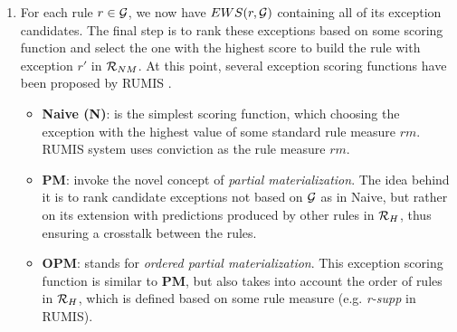 \begin{enumerate}
\item For each rule $r \in \mathcal{G}$, we now have $EWS(r,\mathcal{G})$ containing all of its exception candidates. The final step is to rank these exceptions based on some scoring function and select the one with the highest score to build the rule with exception $r'$ in $\mathcal{R}_{NM}$. At this point, several exception scoring functions have been proposed by RUMIS \cite{rumis}.
\begin{itemize}
\item \textbf{Naive (N)}: is the simplest scoring function, which choosing the exception with the highest value of some standard rule measure $rm$. RUMIS system uses conviction as the rule measure $rm$.
\item \textbf{PM}: invoke the novel concept of \textit{partial materialization}. The idea behind it is to rank candidate exceptions not based on $\mathcal{G}$ as in Naive, but rather on its
extension with predictions produced by other rules in $\mathcal{R}_H$, thus ensuring a crosstalk between the rules.
\item \textbf{OPM}: stands for \textit{ordered partial materialization}. This exception scoring function is similar to \textbf{PM}, but also takes into account the order of rules in $\mathcal{R}_{H}$, which is defined based on some rule measure (e.g. \textit{r-supp} in RUMIS).

\end{itemize}
\end{enumerate}





